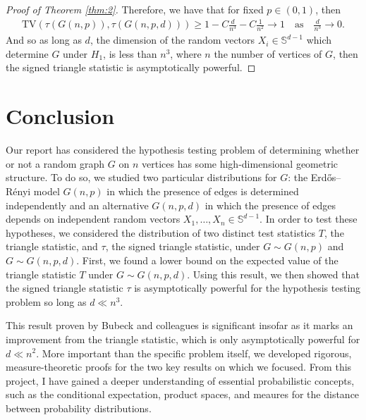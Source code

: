 \documentclass{article}
\begin{document}
\begin{proof}[Proof of Theorem \ref{thm:2}]
Therefore, we have that for fixed $p \in (0,1)$, then 
\begin{align*}
    \text{TV}(\tau(G(n,p)), \tau(G(n,p, d))) \geq 1 - C\frac{d}{n^3} - C\frac{1}{n^2} \longrightarrow 1 \quad \text{as} \quad \frac{d}{n^3} \longrightarrow 0.
\end{align*}
And so as long as $d$, the dimension of the random vectors $X_i \in \mathbb{S}^{d-1}$ which determine $G$ under $H_1$, is less than $n^3$, where $n$ the number of vertices of $G$, then the signed triangle statistic is asymptotically powerful.
\end{proof}

\section{Conclusion}
Our report has considered the hypothesis testing problem of determining whether or not a random graph $G$ on $n$ vertices has some high-dimensional geometric structure. To do so, we studied two particular distributions for $G$: the Erdős–Rényi model $G(n, p)$ in which the presence of edges is determined independently and an alternative $G(n, p, d)$ in which the presence of edges depends on independent random vectors $X_1, \ldots, X_n \in \mathbb{S}^{d-1}$. In order to test these hypotheses, we considered the distribution of two distinct test statistics $T$, the triangle statistic, and $\tau$, the signed triangle statistic, under $G \sim G(n,p)$ and $G \sim G(n,p,d)$. First, we found a lower bound on the expected value of the triangle statistic $T$ under $G \sim G(n, p, d)$. Using this result, we then showed that the signed triangle statistic $\tau$ is asymptotically powerful for the hypothesis testing problem so long as $d \ll n^3$. 

This result proven by Bubeck and colleagues is significant insofar as it marks an improvement from the triangle statistic, which is only asymptotically powerful for $d \ll n^2$. More important than the specific problem itself, we developed rigorous, measure-theoretic proofs for the two key results on which we focused. From this project, I have gained a deeper understanding of essential probabilistic concepts, such as the conditional expectation, product spaces, and meaures for the distance between probability distributions.

\newpage


\end{document}
